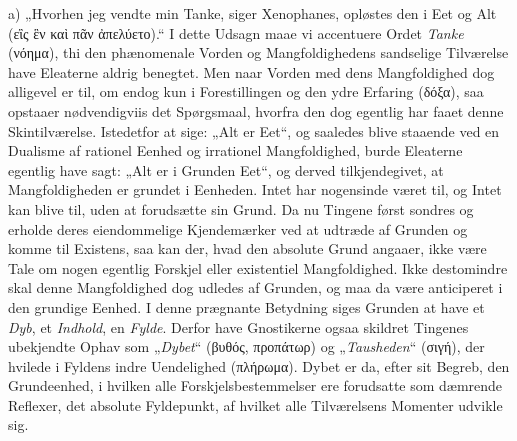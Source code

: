 \documentclass[12pt]{book}
\newcommand{\opage}[1]{\marginnote{\footnotesize\textit{[#1]}}}
\begin{document}
a) „Hvorhen jeg vendte min Tanke, siger Xenophanes, opløstes den i Eet og Alt (εἲς ἓν
καὶ πᾶν ἀπελύετο).“ I dette Udsagn maae vi accentuere Ordet \emph{Tanke} (νόημα), thi
den phænomenale Vorden og Mangfoldighedens sandselige Tilværelse have Eleaterne
aldrig benegtet. Men naar Vorden med dens Mangfoldighed dog alligevel er til, om
endog kun i Forestillingen og den ydre Erfaring (δόξα), saa opstaaer nødvendigviis
det Spørgsmaal, hvorfra den dog egentlig har faaet denne Skintilværelse. Istedetfor
at sige: „Alt er Eet“, og saaledes blive staaende ved en Dualisme af rationel Eenhed
og irrationel Mangfoldighed, burde Eleaterne egentlig have sagt: „Alt er i Grunden
Eet“, og derved tilkjendegivet,
\opage{128} %
at Mangfoldigheden er grundet i Eenheden. Intet har nogensinde været til, og Intet
kan blive til, uden at forudsætte sin Grund. Da nu Tingene først sondres og erholde
deres eiendommelige Kjendemærker ved at udtræde af Grunden og komme til Existens, saa
kan der, hvad den absolute Grund angaaer, ikke være Tale om nogen egentlig Forskjel
eller existentiel Mangfoldighed. Ikke destomindre skal denne Mangfoldighed dog
udledes af Grunden, og maa da være anticiperet i den grundige Eenhed. I denne
prægnante Betydning siges Grunden at have et \emph{Dyb}, et \emph{Indhold}, en
\emph{Fylde}. Derfor have Gnostikerne ogsaa skildret Tingenes ubekjendte Ophav som
„\emph{Dybet}“ (βυθός, προπάτωρ) og „\emph{Tausheden}“ (σιγή), der hvilede i Fyldens
indre Uendelighed (πλήρωμα). Dybet er da, efter sit Begreb, den Grundeenhed, i hvilken
alle Forskjelsbestemmelser ere forudsatte som dæmrende Reflexer, det absolute
Fyldepunkt, af hvilket alle Tilværelsens Momenter udvikle sig.
\end{document}
